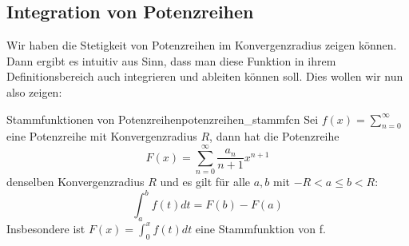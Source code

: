 \subsection{Integration von Potenzreihen}
Wir haben die Stetigkeit von Potenzreihen im Konvergenzradius zeigen können. Dann ergibt es intuitiv aus Sinn, dass man diese Funktion in ihrem Definitionsbereich auch integrieren und ableiten können soll. Dies wollen wir nun also zeigen:

\begin{satz}{Stammfunktionen von Potenzreihen}{potenzreihen_stammfcn}
Sei $f(x) = \sum_{n=0}^\infty$ eine Potenzreihe mit Konvergenzradius $R$, dann hat die Potenzreihe
$$F(x) = \sum_{n=0}^\infty \frac{a_n}{n+1} x^{n+1}$$
denselben Konvergenzradius $R$ und es gilt für alle $a,b$ mit $-R < a \leq b < R$:
$$\int_a^bf(t)dt = F(b) - F(a)$$
Insbesondere ist $F(x) = \int_0^x f(t)dt$ eine Stammfunktion von f.
\end{satz}

